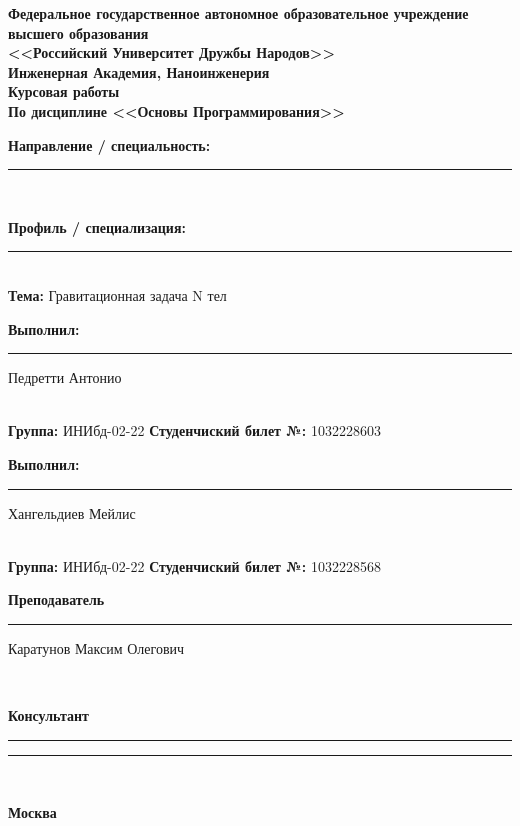 \documentclass{article}
\begin{document}
  \begin{titlepage}
    \begin{center}
    \textbf{Федеральное государственное автономное образовательное учреждение высшего образования\\ <<Российский Университет Дружбы Народов>>\\[1.5pt]Инженерная Академия, Наноинженерия}\\ 
      \vfill
      {\bfseries Курсовая работы}\\[.5em]
      {\bfseries По дисциплине <<Основы Программирования>>}\\[.5em]
      \vspace{2em}
      {\bfseries Направление / специальность: \rule{0.4\linewidth}{0.4pt}}\\
      {\bfseries Профиль / специализация: \rule{0.47\linewidth}{0.4pt}}\\
      \vspace{2em}
      {\textbf{Тема:} Гравитационная задача N тел}\\
    \end{center}
    \vspace{4em}
    \begin{flushleft}
      {\textbf{Выполнил:} \rule{0.2\textwidth}{0.4pt} \space Педретти Антонио}\\
      {\textbf{Группа:} ИНИбд-02-22 \hspace{30pt}\textbf{Студенчиский билет №:} 1032228603}\\[3em]
      {\textbf{Выполнил:} \rule{0.2\textwidth}{0.4pt} \space Хангельдиев Мейлис}\\
      {\textbf{Группа:} ИНИбд-02-22 \hspace{30pt}\textbf{Студенчиский билет №:} 1032228568}\\[3em]
      {\textbf{Преподаватель} \rule{0.2\textwidth}{0.4pt} \space Каратунов Максим Олегович}\\
      {\textbf{Консультант} \rule{0.2\textwidth}{0.4pt} \space \rule{0.45\linewidth}{0.4pt}}\\
      \vfill
    \end{flushleft}
    \begin{center}
      \bfseries Москва \the\year{} \\
    \end{center}
  \end{titlepage}
\end{document}
